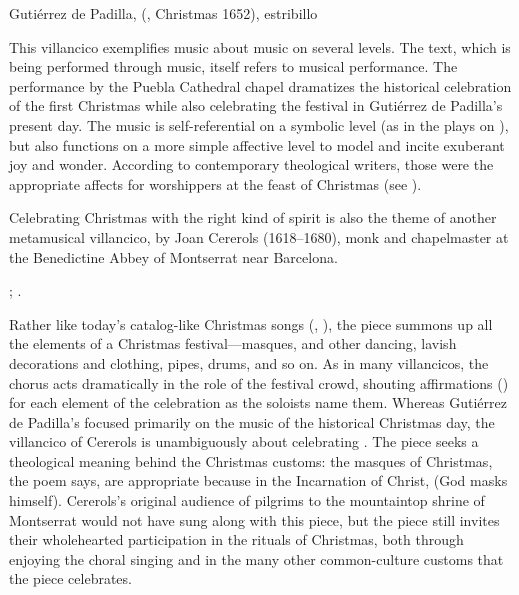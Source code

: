 
{Gutiérrez de Padilla, 
(, Christmas 1652), estribillo}

This villancico exemplifies music about music on several levels.
The text, which is being performed through music, itself refers to musical
performance.
The performance by the Puebla Cathedral chapel dramatizes the historical
celebration of the first Christmas while also celebrating the festival in
Gutiérrez de Padilla's present day.  
The music is self-referential on a symbolic level (as in the plays on
), but also functions on a more simple affective level to model and
incite exuberant joy and wonder.
According to contemporary theological writers, those were the appropriate
affects for worshippers at the feast of Christmas (see
).


Celebrating Christmas with the right kind of spirit is also the theme of
another metamusical villancico,  by Joan
Cererols (1618--1680), monk and chapelmaster at the Benedictine Abbey of
Montserrat near Barcelona.%
\begin{Footnote}
    ; \autocite[81--94]{Cererols:MEM-VC}.
\end{Footnote}
Rather like today's catalog-like Christmas songs (,
), the piece summons up all the
elements of a Christmas festival---masques,  and other
dancing, lavish decorations and clothing, pipes, drums, and so on.
As in many villancicos, the chorus acts dramatically in the role of the
festival crowd, shouting affirmations () for each element of
the celebration as the soloists name them.  
Whereas Gutiérrez de Padilla's  focused
primarily on the music of the historical Christmas day, the villancico of
Cererols is unambiguously about celebrating .
The piece seeks a theological meaning behind the Christmas customs: the masques
of Christmas, the poem says, are appropriate because in the Incarnation of
Christ,  (God masks himself).
Cererols's original audience of pilgrims to the mountaintop shrine of
Montserrat would not have sung along with this piece, but the piece still
invites their wholehearted participation in the rituals of Christmas, both
through enjoying the choral singing and in the many other common-culture
customs that the piece celebrates.

